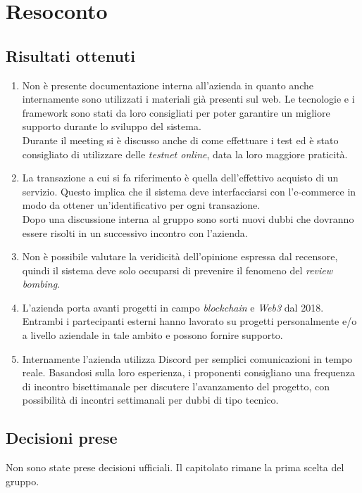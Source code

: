 \section{Resoconto}

\subsection{Risultati ottenuti}
\begin{enumerate}
    \item Non è presente documentazione interna all'azienda in quanto anche internamente sono utilizzati i materiali già presenti sul web. Le tecnologie e i framework sono stati da loro consigliati per poter garantire un migliore supporto durante lo sviluppo del sistema.\\ Durante il meeting si è discusso anche di come effettuare i test ed è stato consigliato di utilizzare delle \emph{testnet online}, data la loro maggiore praticità.
    \item La transazione a cui si fa riferimento è quella dell'effettivo acquisto di un servizio. Questo implica che il sistema deve interfacciarsi con l'e-commerce in modo da ottener un'identificativo per ogni transazione.\\ Dopo una discussione interna al gruppo sono sorti nuovi dubbi che dovranno essere risolti in un successivo incontro con l'azienda.
    \item Non è possibile valutare la veridicità dell'opinione espressa dal recensore, quindi il sistema deve solo occuparsi di prevenire il fenomeno del \textit{review bombing}.
    \item L'azienda porta avanti progetti in campo \emph{blockchain} e \emph{Web3} dal 2018. Entrambi i partecipanti esterni hanno lavorato su progetti personalmente e/o a livello aziendale in tale ambito e possono fornire supporto.
    \item Internamente l'azienda utilizza Discord per semplici comunicazioni in tempo reale. Basandosi sulla loro esperienza, i proponenti consigliano una frequenza di incontro bisettimanale per discutere l'avanzamento del progetto, con possibilità di incontri settimanali per dubbi di tipo tecnico.
\end{enumerate}

\subsection{Decisioni prese}
Non sono state prese decisioni ufficiali. Il capitolato rimane la prima scelta del gruppo.